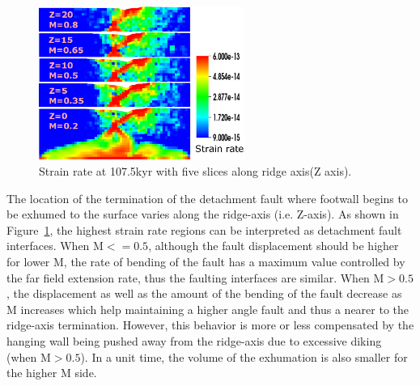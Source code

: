 
\begin{figure}[H]
  \centering
    \includegraphics[width=0.6\textwidth]{fig_Results1_2.eps}
  \caption{Strain rate at 107.5kyr with five slices along ridge axis(Z axis).}
 \label{fig_Results1_2}
\end{figure}   

The location of the termination of the detachment fault where footwall begins to be exhumed to the surface varies along the ridge-axis (i.e. Z-axis). As shown in Figure~\ref{fig_Results1_2}, the highest strain rate regions can be interpreted as detachment fault interfaces. When M$<=0.5$, although the fault displacement should be higher for lower M, the rate of bending of the fault has a maximum value controlled by the far field extension rate, thus the faulting interfaces are similar. When M$>0.5$, the displacement as well as the amount of the bending of the fault decrease as M increases which help maintaining a higher angle fault and thus a nearer to the ridge-axis termination. However, this behavior is more or less compensated by the hanging wall being pushed away from the ridge-axis due to excessive diking (when M$>0.5$). In a unit time, the volume of the exhumation is also smaller for the higher M side.       


